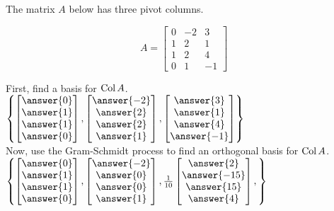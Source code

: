 \documentclass{ximera}
\newcommand{\Col}{\mathop{\rm Col}}
\begin{document}
  	  		                \begin{question} 
  	  		                	The matrix $A$ below has three pivot columns. 
  	  		                	
  	  		                	$$A = \begin{bmatrix}0&-2&3\\1&2&1\\1&2&4\\0&1&-1    \end{bmatrix}$$
  	  		                	
  	  		                	First, find a basis for $\Col A$.\vspace{10pt}\\
  	  		                	
  	  		                	$\left\{  	\begin{bmatrix} \answer{0}\\\answer{1}\\\answer{1}\\\answer{0}\end{bmatrix},  \begin{bmatrix} \answer{-2}\\\answer{2}\\\answer{2}\\\answer{1}\end{bmatrix} , \begin{bmatrix}\answer{3}\\\answer{1}\\\answer{4}\\\answer{-1}\end{bmatrix}    \right\}$\vspace{10pt}\\
  	  		                	
  	  		                	
  	  		               Now, use the Gram-Schmidt process to find an orthogonal basis for $\Col A$.\\
  	  		                	
  	  		                		$\left\{   \begin{bmatrix} \answer{0}\\\answer{1}\\\answer{1}\\\answer{0}\end{bmatrix}, 
  	  		                		\begin{bmatrix} \answer{-2}\\\answer{0}\\\answer{0}\\\answer{1}\end{bmatrix},  
  	  		                		\frac{1}{10}\begin{bmatrix} \answer{2}\\\answer{-15}\\\answer{15}\\\answer{4}\end{bmatrix},                        \right\}$
  	  		                	
  	  		                \end{question}
\end{document}
